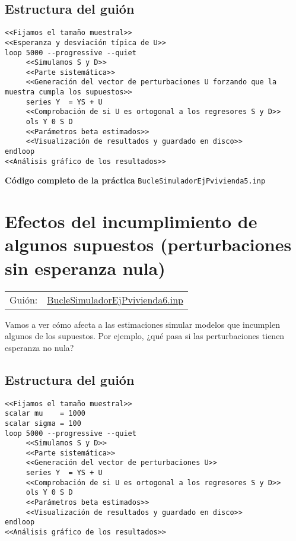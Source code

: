 \documentclass[11pt]{article}
\begin{document}
\subsection{Estructura del guión}
\label{sec:org52b6740}

\begin{verbatim}
<<Fijamos el tamaño muestral>>
<<Esperanza y desviación típica de U>>
loop 5000 --progressive --quiet
     <<Simulamos S y D>>
     <<Parte sistemática>>
     <<Generación del vector de perturbaciones U forzando que la muestra cumpla los supuestos>>
     series Y  = YS + U
     <<Comprobación de si U es ortogonal a los regresores S y D>>
     ols Y 0 S D
     <<Parámetros beta estimados>>
     <<Visualización de resultados y guardado en disco>>
endloop
<<Análisis gráfico de los resultados>>
\end{verbatim}

\clearpage
\noindent
\textbf{Código completo de la práctica} \texttt{BucleSimuladorEjPvivienda5.inp}
\vspace{10pt}

\clearpage


\section{Efectos del incumplimiento de algunos supuestos (perturbaciones sin esperanza nula)}
\label{sec:orgcccfa9b}

\begin{center}
\begin{tabular}{ll}
Guión: & \href{https://github.com/mbujosab/Ectr/tree/master/Practicas/Gretl/scripts/BucleSimuladorEjPvivienda6.inp}{BucleSimuladorEjPvivienda6.inp}\\[0pt]
\end{tabular}
\end{center}

Vamos a ver cómo afecta a las estimaciones simular modelos que
incumplen algunos de los supuestos. Por ejemplo, ¿qué pasa si las
perturbaciones tienen esperanza no nula?

\subsection{Estructura del guión}
\label{sec:org2309048}

\begin{verbatim}
<<Fijamos el tamaño muestral>>
scalar mu    = 1000
scalar sigma = 100
loop 5000 --progressive --quiet
     <<Simulamos S y D>>
     <<Parte sistemática>>
     <<Generación del vector de perturbaciones U>>
     series Y  = YS + U
     <<Comprobación de si U es ortogonal a los regresores S y D>>
     ols Y 0 S D
     <<Parámetros beta estimados>>
     <<Visualización de resultados y guardado en disco>>
endloop
<<Análisis gráfico de los resultados>>
\end{verbatim}
\end{document}
